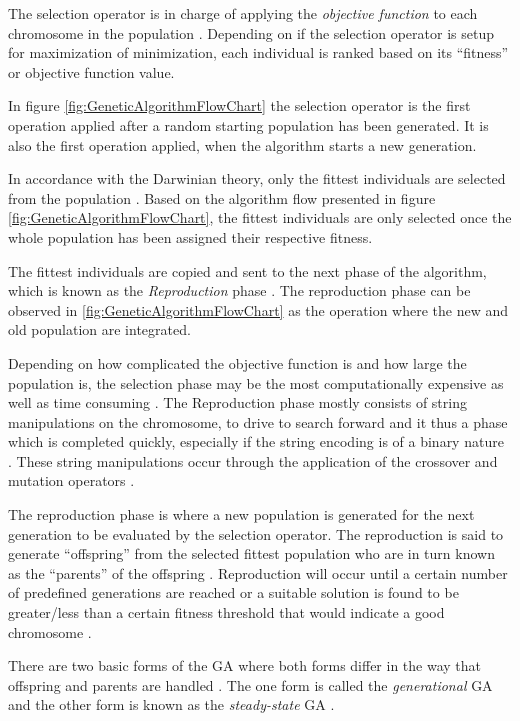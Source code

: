 The selection operator is in charge of applying the \emph{objective function} to each chromosome in the population \cite{AdaptiveSAGA,HumanPassiveGA}. Depending on if the selection operator is setup for maximization of minimization, each individual is ranked based on its ``fitness'' or objective function value.

In figure \ref{fig:GeneticAlgorithmFlowChart} the selection operator is the first operation applied after a random starting population has been generated. It is also the first operation applied, when the algorithm starts a new generation.

In accordance with the Darwinian theory, only the fittest individuals are selected from the population \cite{HumanPassiveGA}. Based on the algorithm flow presented in figure \ref{fig:GeneticAlgorithmFlowChart}, the fittest individuals are only selected once the whole population has been assigned their respective fitness. 

The fittest individuals are copied and sent to the next phase of the algorithm, which is known as the \emph{Reproduction} phase \cite{HumanPassiveGA}. The reproduction phase can be observed in \ref{fig:GeneticAlgorithmFlowChart} as the operation where the new and old population are integrated.

Depending on how complicated the objective function is and how large the population is, the selection phase may be the most computationally expensive as well as time consuming \cite{AcceleratingGA}. The Reproduction phase mostly consists of string manipulations on the chromosome, to drive to search forward and it thus a phase which is completed quickly, especially if the string encoding is of a binary nature \cite{AcceleratingGA,AdaptiveSAGA}. These string manipulations occur through the application of the crossover and mutation operators \cite{ConstrainedGA}. 

The reproduction phase is where a new population is generated for the next generation to be evaluated by the selection operator. The reproduction is said to generate ``offspring'' from the selected fittest population who are in turn known as the ``parents'' of the offspring \cite{HumanPassiveGA,ConstrainedGA}. Reproduction will occur until a certain number of predefined generations are reached or a suitable solution is found to be greater/less than a certain fitness threshold that would indicate a good chromosome \cite{GATSP}.

There are two basic forms of the GA where both forms differ in the way that offspring and parents are handled \cite{FamilyGA}. The one form is called the \emph{generational} GA  and the other form is known as the \emph{steady-state} GA \cite{GeostatisticalGA,FamilyGA}.

